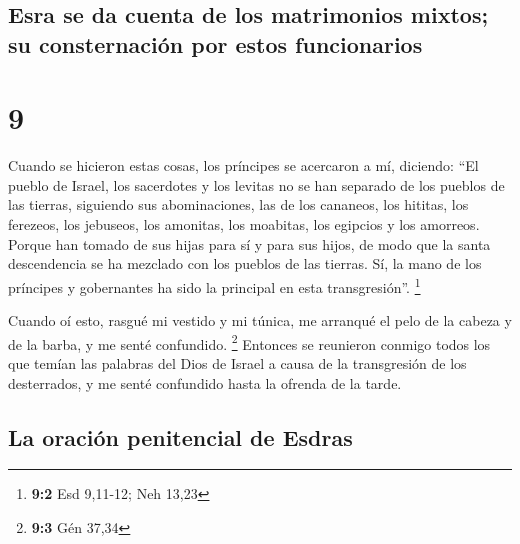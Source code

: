 \hypertarget{esra-se-da-cuenta-de-los-matrimonios-mixtos-su-consternaciuxf3n-por-estos-funcionarios}{%
\subsection{Esra se da cuenta de los matrimonios mixtos; su
consternación por estos
funcionarios}\label{esra-se-da-cuenta-de-los-matrimonios-mixtos-su-consternaciuxf3n-por-estos-funcionarios}}

\hypertarget{section-8}{%
\section{9}\label{section-8}}

 Cuando se hicieron estas cosas, los príncipes se
acercaron a mí, diciendo: ``El pueblo de Israel, los sacerdotes y los
levitas no se han separado de los pueblos de las tierras, siguiendo sus
abominaciones, las de los cananeos, los hititas, los ferezeos, los
jebuseos, los amonitas, los moabitas, los egipcios y los amorreos.
 Porque han tomado de sus hijas para sí y para sus hijos,
de modo que la santa descendencia se ha mezclado con los pueblos de las
tierras. Sí, la mano de los príncipes y gobernantes ha sido la principal
en esta transgresión''. \footnote{\textbf{9:2} Esd 9,11-12; Neh 13,23}

 Cuando oí esto, rasgué mi vestido y mi túnica, me
arranqué el pelo de la cabeza y de la barba, y me senté confundido.
\footnote{\textbf{9:3} Gén 37,34}  Entonces se reunieron
conmigo todos los que temían las palabras del Dios de Israel a causa de
la transgresión de los desterrados, y me senté confundido hasta la
ofrenda de la tarde.

\hypertarget{la-oraciuxf3n-penitencial-de-esdras}{%
\subsection{La oración penitencial de
Esdras}\label{la-oraciuxf3n-penitencial-de-esdras}}

